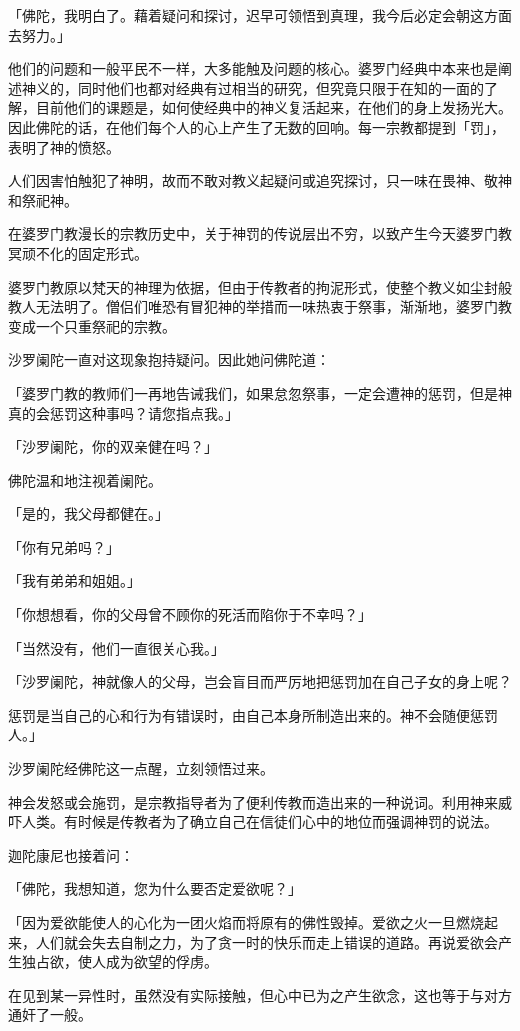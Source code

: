 \documentclass[twoside,openany]{book}
\begin{document}
「佛陀，我明白了。藉着疑问和探讨，迟早可领悟到真理，我今后必定会朝这方面去努力。」

他们的问题和一般平民不一样，大多能触及问题的核心。婆罗门经典中本来也是阐述神义的，同时他们也都对经典有过相当的研究，但究竟只限于在知的一面的了解，目前他们的课题是，如何使经典中的神义复活起来，在他们的身上发扬光大。因此佛陀的话，在他们每个人的心上产生了无数的回响。每一宗教都提到「罚」，表明了神的愤怒。

人们因害怕触犯了神明，故而不敢对教义起疑问或追究探讨，只一味在畏神、敬神和祭祀神。

在婆罗门教漫长的宗教历史中，关于神罚的传说层出不穷，以致产生今天婆罗门教冥顽不化的固定形式。

婆罗门教原以梵天的神理为依据，但由于传教者的拘泥形式，使整个教义如尘封般教人无法明了。僧侣们唯恐有冒犯神的举措而一味热衷于祭事，渐渐地，婆罗门教变成一个只重祭祀的宗教。

沙罗阑陀一直对这现象抱持疑问。因此她问佛陀道：

「婆罗门教的教师们一再地告诫我们，如果怠忽祭事，一定会遭神的惩罚，但是神真的会惩罚这种事吗？请您指点我。」

「沙罗阑陀，你的双亲健在吗？」

佛陀温和地注视着阑陀。

「是的，我父母都健在。」

「你有兄弟吗？」

「我有弟弟和姐姐。」

「你想想看，你的父母曾不顾你的死活而陷你于不幸吗？」

「当然没有，他们一直很关心我。」

「沙罗阑陀，神就像人的父母，岂会盲目而严厉地把惩罚加在自己子女的身上呢？

惩罚是当自己的心和行为有错误时，由自己本身所制造出来的。神不会随便惩罚人。」

沙罗阑陀经佛陀这一点醒，立刻领悟过来。

神会发怒或会施罚，是宗教指导者为了便利传教而造出来的一种说词。利用神来威吓人类。有时候是传教者为了确立自己在信徒们心中的地位而强调神罚的说法。

迦陀康尼也接着问：

「佛陀，我想知道，您为什么要否定爱欲呢？」

「因为爱欲能使人的心化为一团火焰而将原有的佛性毁掉。爱欲之火一旦燃烧起来，人们就会失去自制之力，为了贪一时的快乐而走上错误的道路。再说爱欲会产生独占欲，使人成为欲望的俘虏。

在见到某一异性时，虽然没有实际接触，但心中已为之产生欲念，这也等于与对方通奸了一般。
\end{document}
